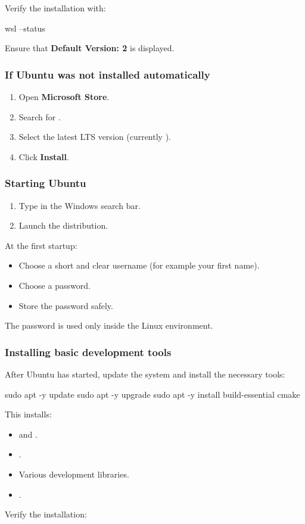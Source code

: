 Verify the installation with:

\begin{shell}
wsl --status
\end{shell}

\noindent Ensure that \textbf{Default Version: 2} is displayed.

\subsubsection{If Ubuntu was not installed automatically}
\begin{enumerate}
  \item Open \textbf{Microsoft Store}.
  \item Search for .
  \item Select the latest LTS version (currently ).
  \item Click \textbf{Install}.
\end{enumerate}

\subsubsection{Starting Ubuntu}
\begin{enumerate}
  \item Type  in the Windows search bar.
  \item Launch the distribution.
\end{enumerate}
At the first startup:
\begin{itemize}
  \item Choose a short and clear username (for example your first name).
  \item Choose a password.
  \item Store the password safely.
\end{itemize}
\note The password is used only inside the Linux environment.

\subsubsection{Installing basic development tools}
After Ubuntu has started, update the system and install the necessary tools:

\begin{shell}
sudo apt -y update
sudo apt -y upgrade
sudo apt -y install build-essential cmake
\end{shell}

\noindent This installs:
\begin{itemize}
  \item {} and .
  \item {}.
  \item Various development libraries.
  \item {}.
\end{itemize}
Verify the installation:

